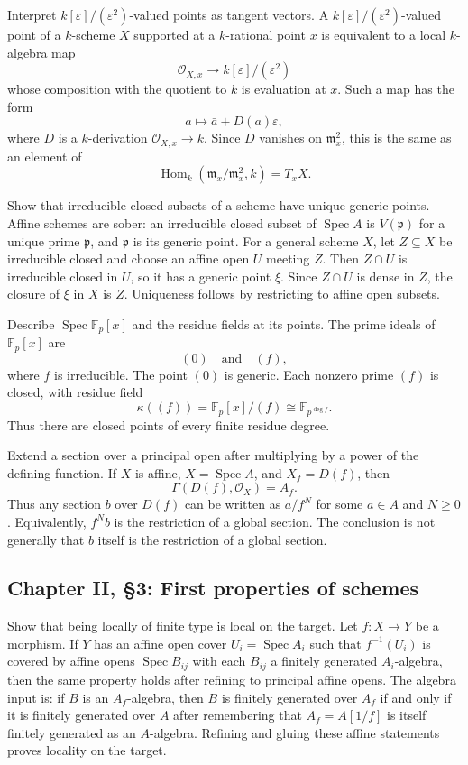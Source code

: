 \documentclass[12pt]{article}
\theoremstyle{plain}
\theoremstyle{definition}
\newcommand{\Spec}{\operatorname{Spec}}
\begin{document}
\questionpar Interpret $k[\varepsilon]/(\varepsilon^2)$-valued points as tangent vectors.
\solutionpar A $k[\varepsilon]/(\varepsilon^2)$-valued point of a $k$-scheme $X$ supported at a $k$-rational point $x$ is equivalent to a local $k$-algebra map
\[
\mathcal O_{X,x}\to k[\varepsilon]/(\varepsilon^2)
\]
whose composition with the quotient to $k$ is evaluation at $x$. Such a map has the form
\[
a\longmapsto \bar a+D(a)\varepsilon,
\]
where $D$ is a $k$-derivation $\mathcal O_{X,x}\to k$. Since $D$ vanishes on $\mathfrak m_x^2$, this is the same as an element of
\[
\operatorname{Hom}_k(\mathfrak m_x/\mathfrak m_x^2,k)=T_xX.
\]

\questionpar Show that irreducible closed subsets of a scheme have unique generic points.
\solutionpar Affine schemes are sober: an irreducible closed subset of $\Spec A$ is $V(\mathfrak p)$ for a unique prime $\mathfrak p$, and $\mathfrak p$ is its generic point. For a general scheme $X$, let $Z\subseteq X$ be irreducible closed and choose an affine open $U$ meeting $Z$. Then $Z\cap U$ is irreducible closed in $U$, so it has a generic point $\xi$. Since $Z\cap U$ is dense in $Z$, the closure of $\xi$ in $X$ is $Z$. Uniqueness follows by restricting to affine open subsets.

\questionpar Describe $\Spec\mathbb F_p[x]$ and the residue fields at its points.
\solutionpar The prime ideals of $\mathbb F_p[x]$ are
\[
(0)\quad\text{and}\quad(f),
\]
where $f$ is irreducible. The point $(0)$ is generic. Each nonzero prime $(f)$ is closed, with residue field
\[
\kappa((f))=\mathbb F_p[x]/(f)\cong\mathbb F_{p^{\deg f}}.
\]
Thus there are closed points of every finite residue degree.

\questionpar Extend a section over a principal open after multiplying by a power of the defining function.
\solutionpar If $X$ is affine, $X=\Spec A$, and $X_f=D(f)$, then
\[
\Gamma(D(f),\mathcal O_X)=A_f.
\]
Thus any section $b$ over $D(f)$ can be written as $a/f^N$ for some $a\in A$ and $N\geq0$. Equivalently, $f^Nb$ is the restriction of a global section. The conclusion is not generally that $b$ itself is the restriction of a global section.

\subsection{Chapter II, \S 3: First properties of schemes}

\questionpar Show that being locally of finite type is local on the target.
\solutionpar Let $f:X\to Y$ be a morphism. If $Y$ has an affine open cover $U_i=\Spec A_i$ such that $f^{-1}(U_i)$ is covered by affine opens $\Spec B_{ij}$ with each $B_{ij}$ a finitely generated $A_i$-algebra, then the same property holds after refining to principal affine opens. The algebra input is: if $B$ is an $A_f$-algebra, then $B$ is finitely generated over $A_f$ if and only if it is finitely generated over $A$ after remembering that $A_f=A[1/f]$ is itself finitely generated as an $A$-algebra. Refining and gluing these affine statements proves locality on the target.
\end{document}
